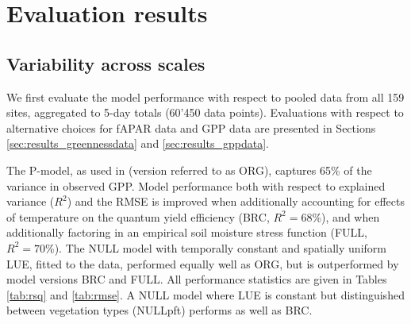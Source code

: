 \documentclass{myreport}
\begin{document}
\section{Evaluation results}
\label{sec:results}

\subsection{Variability across scales}

We first evaluate the model performance with respect to pooled data from all 159 sites, aggregated to 5-day totals (60’450 data points). Evaluations with respect to alternative choices for fAPAR data and GPP data are presented in Sections \ref{sec:results_greennessdata} and \ref{sec:results_gppdata}. 

The P-model, as used in \cite{wang17natpl} (version referred to as ORG), captures 65\% of the variance in observed GPP. Model performance both with respect to explained variance ($R^2$) and the RMSE is improved when additionally accounting for effects of temperature on the quantum yield efficiency (BRC, $R^2 = 68$\%), and when additionally factoring in an empirical soil moisture stress function (FULL, $R^2 = 70$\%). The NULL model with temporally constant and spatially uniform LUE, fitted to the data, performed equally well as ORG, but is outperformed by model versions BRC and FULL. All performance statistics are given in Tables \ref{tab:rsq} and \ref{tab:rmse}. A NULL model where LUE is constant but distinguished between vegetation types (NULLpft) performs as well as BRC. 
\end{document}
